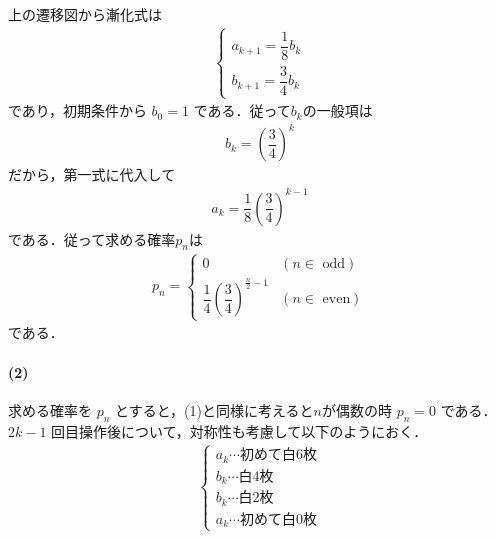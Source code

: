 \documentclass[../../main.tex]{subfiles}
\begin{document}
上の遷移図から漸化式は
\begin{align}
  \begin{cases}
    a_{k+1} = \dfrac{1}{8} b_k \\
    b_{k+1} = \dfrac{3}{4} b_k
  \end{cases}
\end{align}
であり，初期条件から $b_0 = 1$ である．従って$b_k$の一般項は
\begin{align}
  b_k = \left(\dfrac{3}{4}\right)^k
\end{align}
だから，第一式に代入して
\begin{align}
  a_k = \dfrac{1}{8}\left(\dfrac{3}{4}\right)^{k-1}
\end{align}
である．従って求める確率$p_n$は
\begin{align}
  p_n =
  \begin{cases}
    0 & (n \in \text{ odd}) \\
    \dfrac{1}{4}\left(\dfrac{3}{4}\right)^{\frac{n}{2}-1} & (n \in \text{ even})
  \end{cases} \label{eq:1}
\end{align}
である．

\paragraph{(2)}

求める確率を $p_n$ とすると，(1)と同様に考えると$n$が偶数の時 $p_n = 0$ である．
$2k-1$ 回目操作後について，対称性も考慮して以下のようにおく．
\begin{align}
  \begin{cases}
    a_k \cdots \text{初めて白6枚} \\
    b_k \cdots \text{白4枚} \\
    b_k \cdots \text{白2枚} \\
    a_k \cdots \text{初めて白0枚}
  \end{cases}
\end{align}
\end{document}
